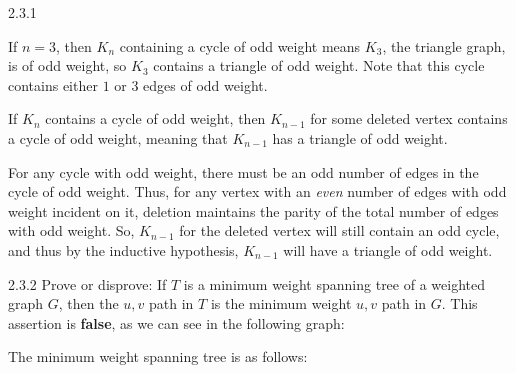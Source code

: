 \documentclass[8pt]{extarticle}
\begin{document}
{\begin{problem}{2.3.1}
\begin{description}[font=\normalfont\scshape]
        \begin{description}[font = \normalfont\scshape]
          \item[Base Case:] If $n = 3$, then $K_n$ containing a cycle of odd weight means $K_3$, the triangle graph, is of odd weight, so $K_3$ contains a triangle of odd weight. Note that this cycle contains either $1$ or $3$ edges of odd weight.
          \item[Inductive Hypothesis:] If $K_n$ contains a cycle of odd weight, then $K_{n-1}$ for some deleted vertex contains a cycle of odd weight, meaning that $K_{n-1}$ has a triangle of odd weight.
          \item[Proof:] For any cycle with odd weight, there must be an odd number of edges in the cycle of odd weight. Thus, for any vertex with an \textit{even} number of edges with odd weight incident on it, deletion maintains the parity of the total number of edges with odd weight. So, $K_{n-1}$ for the deleted vertex will still contain an odd cycle, and thus by the inductive hypothesis, $K_{n-1}$ will have a triangle of odd weight.
        \end{description}
    \end{description}
  \end{problem}
  \begin{problem}{2.3.2}
    Prove or disprove: If $T$ is a minimum weight spanning tree of a weighted graph $G$, then the $u,v$ path in $T$ is the minimum weight $u,v$ path in $G$.
    \tcblower
    This assertion is \textbf{false}, as we can see in the following graph:
    \begin{center}
    \end{center}
    The minimum weight spanning tree is as follows:
    \begin{center}
\end{center}
\end{problem}}
\end{document}
